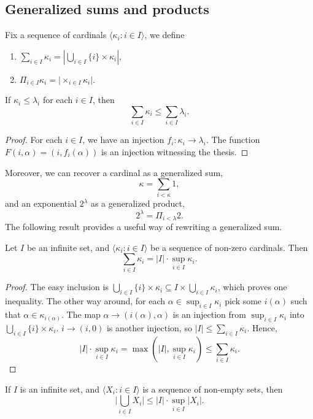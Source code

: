 \documentclass[twoside,openright,titlepage,numbers=noenddot,%
               headinclude,footinclude,cleardoublepage=empty,abstract=on,
               BCOR=23mm,paper=letter,fontsize=11pt
               ]{scrreprt}
\begin{document}
\subsection{Generalized sums and products}
Fix a sequence of cardinals $\langle \kappa_i: i \in I \rangle$, we define
\begin{enumerate}
    \item $\sum_{i \in I} \kappa_i = \left\vert \bigcup_{i \in I} \{i\} \times \kappa_i \right\vert$,
    \item $\Pi_{i \in I} \kappa_i = \big\vert \times_{i \in I} \kappa_i \big\vert$.
\end{enumerate}
\begin{proposition}
    If $\kappa_i \leq \lambda_i$ for each $i \in I$, then
    \[ \sum_{i\in I} \kappa_i \leq \sum_{i \in I} \lambda_i. \]
\end{proposition}
\begin{proof}
    For each $i \in I$, we have an injection $f_i: \kappa_i \to \lambda_i$. The function $F(i, \alpha) = (i, f_i(\alpha))$ is an injection witnessing the thesis.
\end{proof}
Moreover, we can recover a cardinal as a generalized sum,
\[ \kappa = \sum_{i < \kappa} 1, \]
and an exponential $2^\lambda$ as a generalized product,
\[ 2^\lambda = \Pi_{i < \lambda} 2. \]
The following result provides a useful way of rewriting a generalized sum.
\begin{theorem}
    Let $I$ be an infinite set, and $\langle \kappa_i: i \in I\rangle$ be a sequence of non-zero cardinals. Then
    \[ \sum_{i \in I} \kappa_i = \vert I \vert \cdot \sup_{i \in I} \kappa_i. \]
\end{theorem}
\begin{proof}
    The easy inclusion is $\bigcup_{i \in I} \{i\} \times \kappa_i \subseteq I \times \bigcup_{i \in I} \kappa_i$, which proves one inequality.
    The other way around, for each $\alpha \in \sup_{i \in I}\kappa_i$ pick some $i(\alpha)$ such that $\alpha \in \kappa_{i(\alpha)}$. The map $\alpha \to (i(\alpha), \alpha)$ is an injection from $\sup_{i \in I}\kappa_i$ into $\bigcup_{i \in I} \{i\} \times \kappa_i$. $i \to (i,0)$ is another injection, so $\vert I \vert \leq \sum_{i \in I} \kappa_i$. Hence, 
    \[ \vert I \vert \cdot \sup_{i \in I} \kappa_i = \max(\vert I \vert, \sup_{i \in I} \kappa_i) \leq \sum_{i \in I} \kappa_i.\]
\end{proof}
\begin{corollary}
    If $I$ is an infinite set, and $\langle X_i: i \in I \rangle$ is a sequence of non-empty sets, then
    \[ \vert \bigcup_{i \in I} X_i \vert \leq \vert I \vert \cdot \sup_{i \in I} \vert X_i \vert. \]
\end{corollary}
\end{document}
